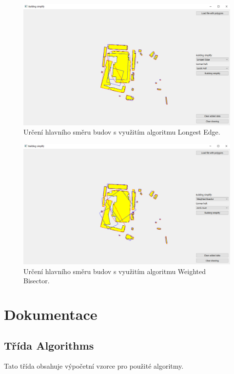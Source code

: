 \documentclass[a4paper, 12pt, oneside, titlepage]{article} %
\begin{document}
\begin{figure}[!htb]
	\centering
	\includegraphics[scale=0.5]{obrazky/lon_edge.png} 
	\caption{Určení hlavního směru budov s využitím algoritmu Longest Edge.
	}
	\label{fig:lon_edge}
\end{figure} 
\FloatBarrier

\begin{figure}[!htb]
	\centering
	\includegraphics[scale=0.5]{obrazky/weig_bi.png} 
	\caption{Určení hlavního směru budov s využitím algoritmu Weighted Bisector.
	}
	\label{fig:weig_bi}
\end{figure} 
\FloatBarrier

\section{Dokumentace}
\subsection{Třída Algorithms}
Tato třída obsahuje výpočetní vzorce pro použité algoritmy.
\end{document}

